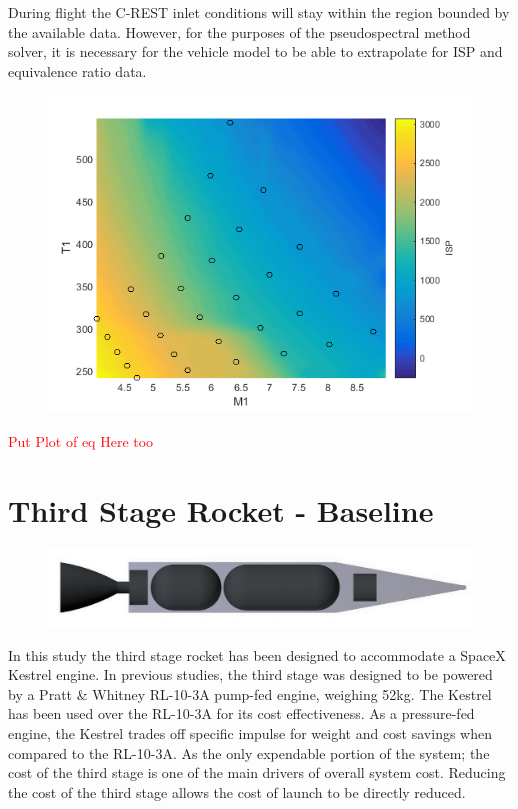 	During flight the C-REST inlet conditions will stay within the region bounded by the available data. However, for the purposes of the pseudospectral method solver, it is necessary for the vehicle model to be able to extrapolate for ISP and equivalence ratio data. 
	
	\begin{figure}
\centering
\includegraphics[width=0.7\linewidth]{figures/3_vehicle_design/ISPinterp}
\caption{}
\label{fig:ISPinterp}
\end{figure}

	
	\textcolor{red}{Put Plot of eq Here too}
	\section{Third Stage Rocket - Baseline}
	
	\begin{figure}
\centering
\includegraphics[width=0.7\linewidth]{figures/3_vehicle_design/3rdStage}
\caption{}
\label{fig:3rdStage}
\end{figure}
	
	In this study the third stage rocket has been designed to accommodate a SpaceX Kestrel engine. In previous studies, the third stage was designed to be powered by a Pratt \& Whitney RL-10-3A pump-fed engine, weighing 52kg. The Kestrel has been used over the RL-10-3A for its cost effectiveness. As a pressure-fed engine, the Kestrel trades off specific impulse for weight and cost savings when compared to the RL-10-3A. As the only expendable portion of the system; the cost of the third stage is one of the main drivers of overall system cost. Reducing the cost of the third stage allows the cost of launch to be directly reduced. 
	
